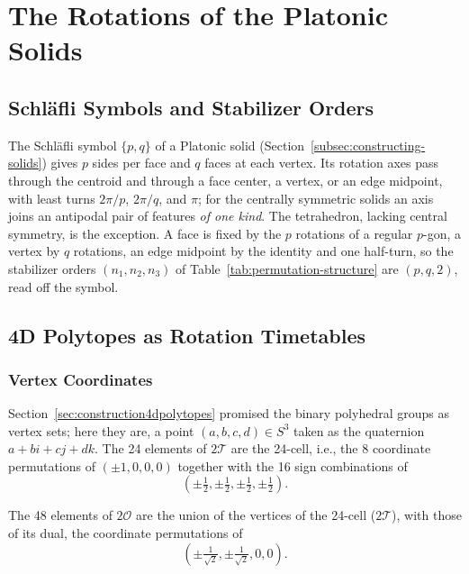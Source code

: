 \documentclass[11pt, oneside, openany]{scrbook}
\newcommand{\Tgroup}{\mathcal{T}}  %
\newcommand{\Ogroup}{\mathcal{O}}  %
\newcommand{\TwoT}{2\Tgroup}
\newcommand{\TwoO}{2\Ogroup}
\begin{document}
\chapter{The Rotations of the Platonic Solids} \label{app:rotations}

\section{Schl\"{a}fli Symbols and Stabilizer Orders} \label{app:rotations:schlafli}

The Schl\"{a}fli symbol $\{p,q\}$ of a Platonic solid (Section~\ref{subsec:constructing-solids}) gives $p$ sides per face and $q$ faces at each vertex. Its rotation axes pass through the centroid and through a face center, a vertex, or an edge midpoint, with least turns $2\pi/p$, $2\pi/q$, and $\pi$; for the centrally symmetric solids an axis joins an antipodal pair of features \textit{of one kind}. The tetrahedron, lacking central symmetry, is the exception. A face is fixed by the $p$ rotations of a regular $p$-gon, a vertex by $q$ rotations, an edge midpoint by the identity and one half-turn, so the stabilizer orders $(n_1, n_2, n_3)$ of Table~\ref{tab:permutation-structure} are $(p, q, 2)$, read off the symbol.

\section{4D Polytopes as Rotation Timetables} \label{app:rotations:4dastimetables}

\subsection{Vertex Coordinates} \label{app:rotations:coordinates}

Section~\ref{sec:construction4dpolytopes} promised the binary polyhedral groups as vertex sets; here they are, a point $(a,b,c,d)\in S^3$ taken as the quaternion $a+bi+cj+dk$. The 24 elements of $\TwoT$ are the 24-cell, i.e., the 8 coordinate permutations of $(\pm 1, 0, 0, 0)$ together with the 16 sign combinations of
$$
\left(\pm \tfrac{1}{2}, \pm \tfrac{1}{2}, \pm \tfrac{1}{2}, \pm \tfrac{1}{2}\right).
$$

The 48 elements of $\TwoO$ are the union of the vertices of the 24-cell ($\TwoT$), with those of its dual, the coordinate permutations of
$$
\left(\pm \tfrac{1}{\sqrt{2}}, \pm \tfrac{1}{\sqrt{2}}, 0, 0\right).
$$
\end{document}
